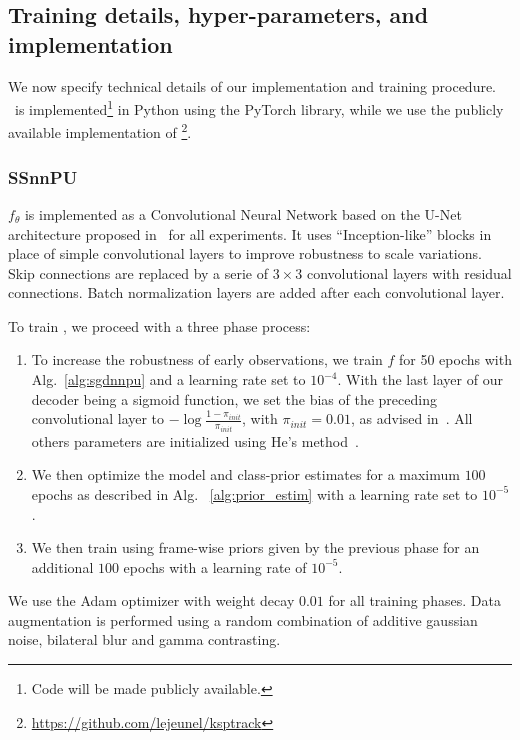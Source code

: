 \subsection{Training details, hyper-parameters, and implementation}
\label{sec:implementation}
We now specify technical details of our implementation and training procedure. \SSnnPU~is implemented\footnote{Code will be made publicly available.} in Python using the PyTorch library, while we use the publicly available implementation of \KSPTrack\footnote{\url{https://github.com/lejeunel/ksptrack}}.

\subsubsection{SSnnPU}
$f_\theta$ is implemented as a Convolutional Neural Network based on the U-Net architecture proposed in~\cite{ibtehaz20} for all experiments. It uses ``Inception-like'' blocks in place of simple convolutional layers to improve robustness to scale variations. Skip connections are replaced by a serie of $3\times3$ convolutional layers with residual connections. Batch normalization layers are added after each convolutional layer.

To train \SSnnPU, we proceed with a three phase process:
\begin{enumerate}
  \item To increase the robustness of early observations, we train $f$ for 50 epochs with Alg.~\ref{alg:sgdnnpu} and a learning rate set to $10^{-4}$. With the last layer of our decoder being a sigmoid function, we set the bias of the preceding convolutional layer to $-\log{\frac{1-\pi_{init}}{\pi_{init}}}$, with $\pi_{init}=0.01$, as advised in~\cite{lin17}. All others parameters are initialized using He's method~\cite{he15init}.
    \item We then optimize the model and class-prior estimates for a maximum $100$ epochs as described in Alg.~ \ref{alg:prior_estim} with a learning rate set to $10^{-5}$.
  \item We then train using frame-wise priors given by the previous phase for an additional $100$ epochs with a learning rate of $10^{-5}$.
\end{enumerate}
We use the Adam optimizer with weight decay $0.01$ for all training phases. Data augmentation is performed using a random combination of additive gaussian noise, bilateral blur and gamma contrasting. 

